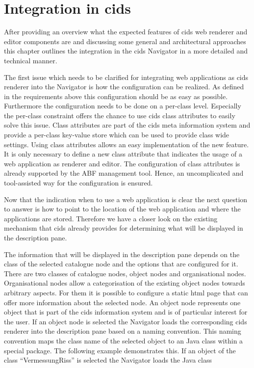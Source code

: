\section{Integration in cids}

After providing an overview what the expected features of cids web renderer and editor components are and discussing some general and architectural approaches this chapter outlines the integration in the cids Navigator in a more detailed and technical manner.

The first issue which needs to be clarified for integrating web applications as cids renderer into the Navigator is how the configuration can be realized.
As defined in the requirements above this configuration should be as easy as possible.
Furthermore the configuration needs to be done on a per-class level.
Especially the per-class constraint offers the chance to use cids class attributes to easily solve this issue.
Class attributes are part of the cids meta information system and provide a per-class key-value store which can be used to provide class wide settings.
Using class attributes allows an easy implementation of the new feature.
It is only necessary to define a new class attribute that indicates the usage of a web application as renderer and editor.
The configuration of class attributes is already supported by the ABF management tool.
Hence, an uncomplicated and tool-assisted way for the configuration is ensured.

Now that the indication when to use a web application is clear the next question to answer is how to point to the location of the web application and where the applications are stored. Therefore we have a closer look on the existing mechanism that cids already provides for determining what will be displayed in the description pane.

The information that will be displayed in the description pane depends on the class of the selected catalogue node and the options that are configured for it.
There are two classes of catalogue nodes, object nodes and organisational nodes. Organisational nodes allow a categorisation of the existing object nodes towards arbitrary aspects.
For them it is possible to configure a static html page that can offer more information about the selected node.
An object node represents one object that is part of the cids information system and is of particular interest for the user.
 If an object node is selected the Navigator loads the corresponding cids  renderer into the description pane based on a naming convention.
This naming convention maps the class name of the selected object to an Java class within a special package. 
The following example demonstrates this. If an object of the class \enquote{VermessungRiss} is selected the Navigator loads the Java class 

